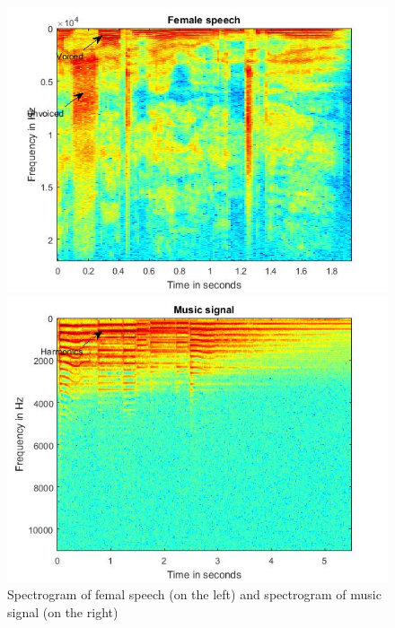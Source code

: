 \begin{figure}[h]
\centering
\begin{minipage}{.5\textwidth}
  \centering
  \includegraphics[width=1\linewidth]{./images/spectrogram_female.jpg}
\end{minipage}%
\begin{minipage}{.5\textwidth}
  \centering
  \includegraphics[width=1\linewidth]{./images/spectrogram_music.jpg}
\end{minipage}
 \caption{Spectrogram of femal speech (on the left) and spectrogram of music signal (on the right)}
 \label{fig:spec_female_music}	
\end{figure}
